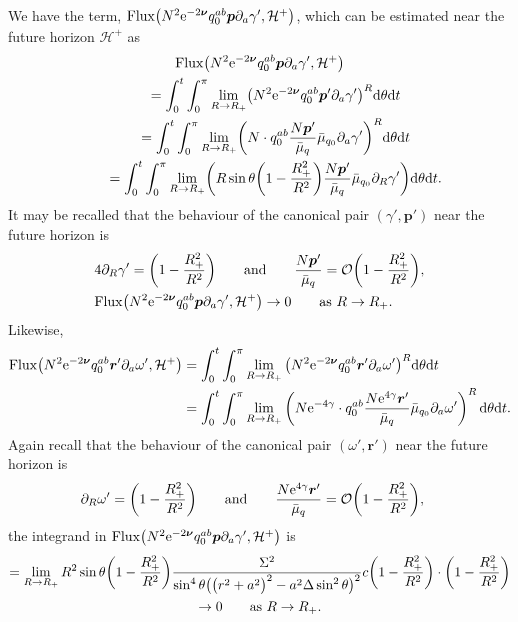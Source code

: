 \documentclass[pdftex]{sigma}
\def\ptl{\partial}%
\def\mbo#1{\boldsymbol{#1}}%
\numberwithin{equation}{section}
\begin{document}
We have the term, ${\rm Flux} \bigl(N^2 {\rm e}^{-2 \mbo{\nu}}q^{ab}_0 \mbo{p} \ptl_a \gamma', \mathcal{H}^+\bigr)$, which can be estimated near the future horizon $\mathcal{H}^+$ as
\begin{gather*}
 {\rm Flux} \bigl(N^2 {\rm e}^{-2 \mbo{\nu}}q^{ab}_0 \mbo{p} \ptl_a \gamma', \mathcal{H}^+\bigr) \notag\\
\qquad{} =
\int^t_0 \int^\pi_0 \lim_{R \to R_+} \bigl(
N^2 {\rm e}^{-2 \mbo{\nu}}q^{ab}_0 \mbo{p}' \ptl_a \gamma' \bigr)^R {\rm d} \theta {\rm d}t \notag\\
\qquad{} = \int^t_0 \int^\pi_0 \lim_{R \to R_+} \biggl( N \cdot q^{ab}_0 \frac{N \mbo{p}'}{\bar{\mu}_q} \bar{\mu}_{q_0} \ptl_a \gamma' \biggr)^R {\rm d}\theta {\rm d}t \notag\\
\qquad{} = \int^t_0 \int^\pi_0 \lim_{R \to R_+} \biggl( R \sin \theta\biggl(1- \frac{R^2_+}{R^2} \biggr) \frac{N \mbo{p}' }{\bar{\mu}_q} \bar{\mu}_{q_0} \ptl_R \gamma' \biggr) {\rm d}\theta {\rm d}t.
\end{gather*}
It may be recalled that the behaviour of the canonical pair $(\gamma',\mbo{p}') $ near the future horizon is
\begin{align*}
&4 \ptl_R \gamma'= \biggl(1- \frac{R^2_+}{R^2} \biggr) \qquad \text{and} \qquad \frac{N \mbo{p}'}{\bar{\mu}_q} = \mathcal{O} \biggl(1- \frac{R^2_+}{R^2} \biggr), \notag\\
&{\rm Flux} \bigl(N^2 {\rm e}^{-2 \mbo{\nu}}q^{ab}_0 \mbo{p} \ptl_a \gamma', \mathcal{H}^+\bigr) \to 0 \qquad \text{as} \ R \to R_+.
\end{align*}
Likewise,
\begin{align*}
{\rm Flux} \bigl(N^2 {\rm e}^{-2 \mbo{\nu}}q^{ab}_0 \mbo{r}' \ptl_a \omega', \mathcal{H}^+\bigr)%
&{}=
\int^t_0 \int^\pi_0 \lim_{R \to R_+} \big( N^2 {\rm e}^{-2 \mbo{\nu}}q^{ab}_0 \mbo{r}' \ptl_a \omega' \big)^R {\rm d}\theta {\rm d} t \notag\\
&{}= \int^t_0 \int^\pi_0 \lim_{R \to R_+} \left( N {\rm e}^{-4\gamma} \cdot q^{ab}_0 \frac{N {\rm e}^{4\gamma} \mbo{r}'}{\bar{\mu}_q} \bar{\mu}_{q_0} \ptl_a \omega' \right)^R {\rm d}\theta {\rm d}t. \notag
\end{align*}
Again recall that the behaviour of the canonical pair $(\omega', \mbo{r}')$ near the future horizon is
\begin{align*}
\ptl_R \omega' &{}= \biggl(1- \frac{R^2_+}{R^2} \biggr) \qquad \text{and} \qquad \frac{N {\rm e}^{4 \gamma} \mbo{r}'}{\bar{\mu}_q} = \mathcal{O}\biggl(1- \frac{R^2_+}{R^2} \biggr), \end{align*}
the integrand in ${\rm Flux} \bigl(N^2 {\rm e}^{-2 \mbo{\nu}}q^{ab}_0 \mbo{p} \ptl_a \gamma', \mathcal{H}^+\bigr)$ is
\begin{gather*}
= \lim_{R \to R_+} R^2 \sin \theta \biggl(1- \frac{R^2_+}{R^2} \biggr) \frac{\Sigma^2}{ \sin^4 \theta \bigl(\bigl(r^2+a^2\bigr)^2-a^2 \Delta \sin^2 \theta \bigr)^2}
 c \biggl(1-\frac{R^2_+}{R^2} \biggr) \cdot \biggl(1-\frac{R^2_+}{R^2} \biggr) \notag\\
 \to 0 \qquad \text{as} \ R \to R_+.
\end{gather*}
\end{document}
